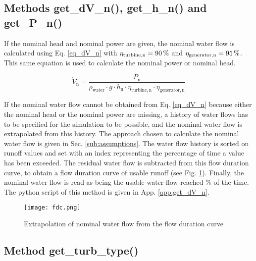 \subsection{Methods get{\_}dV{\_}n(), get{\_}h{\_}n() and get{\_}P{\_}n()}

If the nominal head and nominal power are given, the nominal water flow is calculated using Eq. \eqref{eq_dV_n} with $\eta_\mathrm{turbine, n} = \unit[90]{\%}$ and $\eta_\mathrm{generator, n} = \unit[95]{\%}$. This same equation is used to calculate the nominal power or nominal head.

\begin{equation}
\label{eq_dV_n} 
 \dot{V}_\mathrm{n}=\frac{ P_\mathrm{n}}{\rho_\mathrm{water} \cdot g  \cdot h_\mathrm{n} \cdot \eta_\mathrm{turbine, n} \cdot \eta_\mathrm{generator, n}}
\end{equation}

If the nominal water flow cannot be obtained from Eq. \eqref{eq_dV_n} because either the nominal head or the nominal power are missing, a history of water flows has to be specified for the simulation to be possible, and the nominal water flow is extrapolated from this history. The approach chosen to calculate the nominal water flow is given in Sec. \ref{sub:assumptions}.\newline
The water flow history is sorted on runoff values and set with an index representing the percentage of time a value has been exceeded. The residual water flow is subtracted from this flow duration curve, to obtain a flow duration curve of usable runoff (see Fig. \ref{fdc}). Finally, the nominal water flow is read as being the usable water flow reached \unit[20]{\%} of the time. The python script of this method is given in App. \ref{app:get_dV_n}.

\begin{figure}[H]
\centering
\texttt{[image: fdc.png]}
\caption{Extrapolation of nominal water flow from the flow duration curve}
\label{fdc}
\end{figure}

\subsection{Method get{\_}turb{\_}type()}
\label{sub:get_type}

